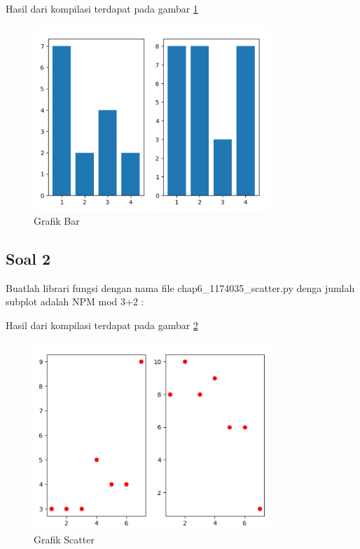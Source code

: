 	Hasil dari kompilasi terdapat pada gambar \ref{1174035_Bar}
	\begin{figure}[ht]
		\centerline{\includegraphics[width=0.8\textwidth]{figures/6/1174035/Praktek/Bar.png}}
		\caption{Grafik Bar}
		\label{1174035_Bar}
	\end{figure}
	\subsection{Soal 2}

	Buatlah librari fungsi dengan nama file chap6\_1174035\_scatter.py denga jumlah subplot adalah NPM mod 3+2 : 

	
	
	Hasil dari kompilasi terdapat pada gambar \ref{1174035_Scatter}
	\begin{figure}[ht]
		\centerline{\includegraphics[width=0.8\textwidth]{figures/6/1174035/Praktek/Scatter.png}}
		\caption{Grafik Scatter}
		\label{1174035_Scatter}
	\end{figure}
	
